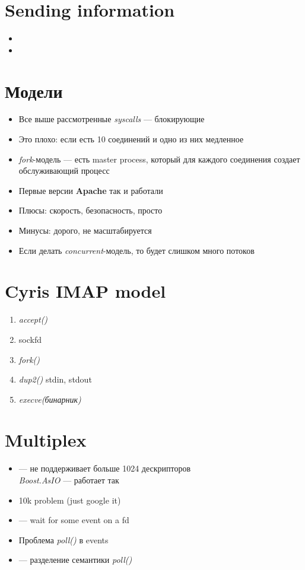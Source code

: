 \documentclass[../../lectures.tex]{subfiles}
\begin{document}
\section{Sending information}
\begin{itemize}
    \item {}
    \item {}
\end{itemize}

\section{Модели}
\begin{itemize}
    \item Все выше рассмотренные \emph{syscalls} --- блокирующие
    \item Это плохо: если есть 10 соединений и одно из них медленное
    \item \emph{fork}-модель --- есть master process, который для каждого соединения
          создает обслуживающий процесс
    \item Первые версии \textbf{Apache} так и работали
    \item Плюсы: скорость, безопасность, просто
    \item Минусы: дорого, не масштабируется
    \item Если делать \emph{concurrent}-модель, то будет слишком много потоков
\end{itemize}

\section{Cyris IMAP model}
\begin{enumerate}
    \item \emph{accept()}
    \item sockfd
    \item \emph{fork()}
    \item \emph{dup2()} stdin, stdout
    \item \emph{execve(бинарник)}
\end{enumerate}

\section{Multiplex}
\begin{itemize}
    \item {} --- не поддерживает больше 1024 дескрипторов\\
        \emph{Boost.AsIO} --- работает так
    \item 10k problem (just google it)
    \item {} --- wait for some event on a fd
    \item Проблема \emph{poll()} в events
    \item {} --- разделение семантики \emph{poll()}
\end{itemize}
\end{document}
